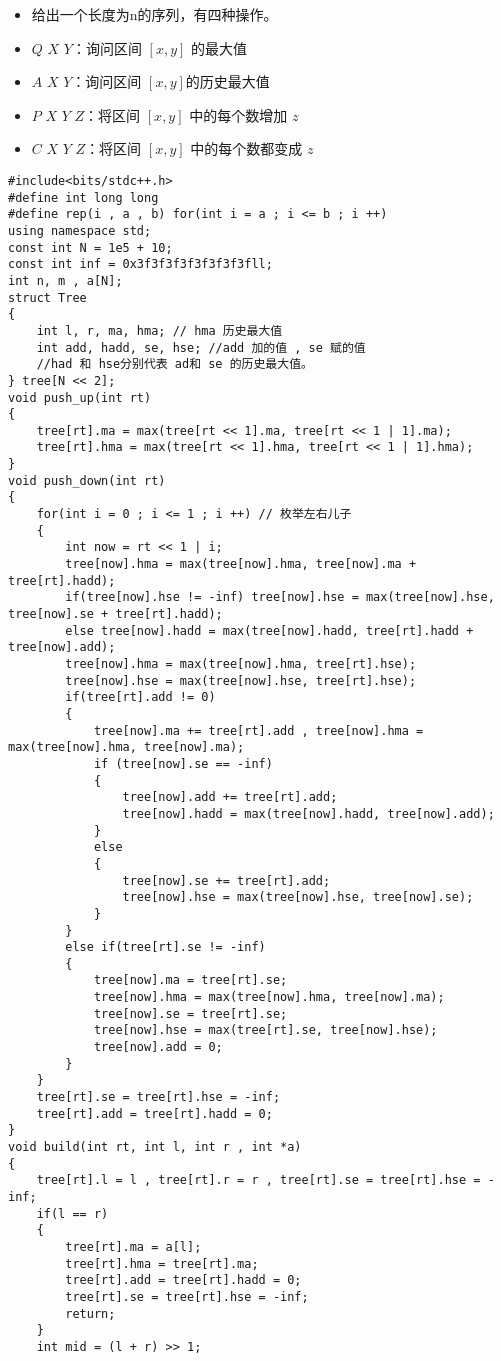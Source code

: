 \documentclass[E:/GsjzTle/main/main.tex]{subfiles}
\begin{document}
\begin{itemize}
\item
  给出一个长度为n的序列，有四种操作。
\item
  \(Q\) \(X\) \(Y\)：询问区间 \([x,y]\) 的最大值
\item
  \(A\) \(X\) \(Y\)：询问区间 \([x,y]\)的历史最大值
\item
  \(P\) \(X\) \(Y\) \(Z\)：将区间 \([x,y]\) 中的每个数增加 \(z\)
\item
  \(C\) \(X\) \(Y\) \(Z\)：将区间 \([x,y]\) 中的每个数都变成 \(z\)
\end{itemize}

\begin{lstlisting}
#include<bits/stdc++.h>
#define int long long
#define rep(i , a , b) for(int i = a ; i <= b ; i ++)
using namespace std;
const int N = 1e5 + 10;
const int inf = 0x3f3f3f3f3f3f3f3fll;
int n, m , a[N];
struct Tree
{
	int l, r, ma, hma; // hma 历史最大值 
	int add, hadd, se, hse; //add 加的值 , se 赋的值
	//had 和 hse分别代表 ad和 se 的历史最大值。
} tree[N << 2];
void push_up(int rt)
{
	tree[rt].ma = max(tree[rt << 1].ma, tree[rt << 1 | 1].ma);
	tree[rt].hma = max(tree[rt << 1].hma, tree[rt << 1 | 1].hma);
}
void push_down(int rt)
{
	for(int i = 0 ; i <= 1 ; i ++) // 枚举左右儿子
	{
		int now = rt << 1 | i; 
		tree[now].hma = max(tree[now].hma, tree[now].ma + tree[rt].hadd);
		if(tree[now].hse != -inf) tree[now].hse = max(tree[now].hse, tree[now].se + tree[rt].hadd);
		else tree[now].hadd = max(tree[now].hadd, tree[rt].hadd + tree[now].add);
		tree[now].hma = max(tree[now].hma, tree[rt].hse);
		tree[now].hse = max(tree[now].hse, tree[rt].hse);
		if(tree[rt].add != 0)
		{
			tree[now].ma += tree[rt].add , tree[now].hma = max(tree[now].hma, tree[now].ma);
			if (tree[now].se == -inf)
			{
				tree[now].add += tree[rt].add;
				tree[now].hadd = max(tree[now].hadd, tree[now].add);
			}
			else
			{
				tree[now].se += tree[rt].add;
				tree[now].hse = max(tree[now].hse, tree[now].se);
			}
		}
		else if(tree[rt].se != -inf)
		{
			tree[now].ma = tree[rt].se;
			tree[now].hma = max(tree[now].hma, tree[now].ma);
			tree[now].se = tree[rt].se;
			tree[now].hse = max(tree[rt].se, tree[now].hse);
			tree[now].add = 0;
		}
	}
	tree[rt].se = tree[rt].hse = -inf;
	tree[rt].add = tree[rt].hadd = 0;
}
void build(int rt, int l, int r , int *a)
{
	tree[rt].l = l , tree[rt].r = r , tree[rt].se = tree[rt].hse = -inf;
	if(l == r)
	{
		tree[rt].ma = a[l];
		tree[rt].hma = tree[rt].ma;
		tree[rt].add = tree[rt].hadd = 0;
		tree[rt].se = tree[rt].hse = -inf;
		return;
	}
	int mid = (l + r) >> 1;

\end{lstlisting}
\end{document}
